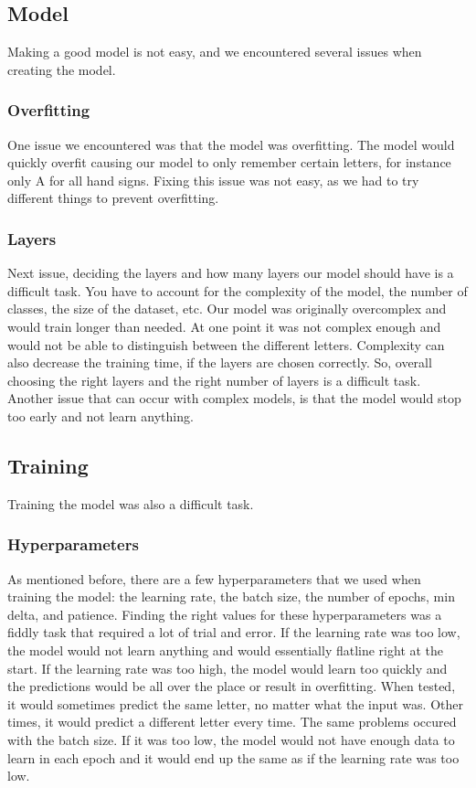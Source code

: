 \documentclass[../paper.tex]{subfiles}
\begin{document}
\subsection{Model}
Making a good model is not easy, and we encountered several issues when creating the model.
\subsubsection{Overfitting}
One issue we encountered was that the model was overfitting. 
The model would quickly overfit causing our model to only remember certain letters, for instance only A for all hand signs.
Fixing this issue was not easy, as we had to try different things to prevent overfitting.
\subsubsection{Layers}
Next issue, deciding the layers and how many layers our model should have is a difficult task.
You have to account for the complexity of the model, the number of classes, the size of the dataset, etc.
Our model was originally overcomplex and would train longer than needed. 
At one point it was not complex enough and would not be able to distinguish between the different letters.
Complexity can also decrease the training time, if the layers are chosen correctly.
So, overall choosing the right layers and the right number of layers is a difficult task.
Another issue that can occur with complex models, is that the model would stop too early and not learn anything.
\subsection{Training}
Training the model was also a difficult task.
\subsubsection{Hyperparameters}
As mentioned before, there are a few hyperparameters that we used when training the model: the learning rate, the batch size, the number of epochs, min delta, and patience.
Finding the right values for these hyperparameters was a fiddly task that required a lot of trial and error. 
If the learning rate was too low, the model would not learn anything
and would essentially flatline right at the start. 
If the learning rate was too high, the model would learn too quickly and the predictions would be all over the place or result in overfitting.
When tested, it would sometimes predict the same letter, no matter what the input was. 
Other times, it would predict a different letter every time.
The same problems occured with the batch size. 
If it was too low, the model would not have enough data to learn in each epoch and it would end up the same as if the learning rate was too low.
\end{document}

